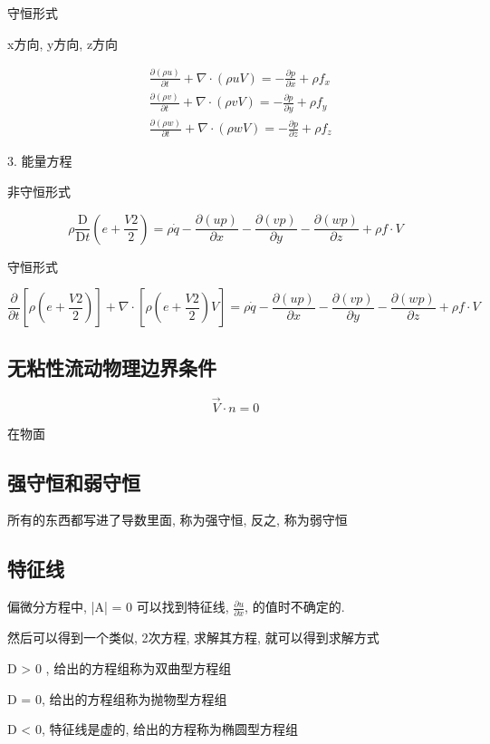 \documentclass[UTF8]{ctexart}
\begin{document}
守恒形式

x方向, y方向, z方向

$$
	\begin{aligned}
		 & \frac{\partial(\rho u)}{\partial t}+\nabla \cdot(\rho u V)=-\frac{\partial p}{\partial x}+\rho f_{x} \\
		 & \frac{\partial(\rho v)}{\partial t}+\nabla \cdot(\rho v V)=-\frac{\partial p}{\partial y}+\rho f_{y} \\
		 & \frac{\partial(\rho w)}{\partial t}+\nabla \cdot(\rho w V)=-\frac{\partial p}{\partial z}+\rho f_{z}
	\end{aligned}
$$

3. 能量方程

非守恒形式

$$
	\rho \frac{\mathrm{D}}{\mathrm{D} t}\left(e+\frac{V 2}{2}\right)=\rho \dot{q}-\frac{\partial(u p)}{\partial x}-\frac{\partial(v p)}{\partial y}-\frac{\partial(w p)}{\partial z}+\rho f \cdot V
$$

守恒形式

$$
	\frac{\partial}{\partial t}\left[\rho\left(e+\frac{V 2}{2}\right)\right]+\nabla \cdot\left[\rho\left(e+\frac{V 2}{2}\right) V\right]=\rho \dot{q}-\frac{\partial(u p)}{\partial x}-\frac{\partial(v p)}{\partial y}-\frac{\partial(w p)}{\partial z}+\rho f \cdot V
$$

\subsection{无粘性流动物理边界条件}
$$
	\vec{V} \cdot n = 0
$$

在物面

\subsection{强守恒和弱守恒}

所有的东西都写进了导数里面, 称为强守恒, 反之, 称为弱守恒

\subsection{特征线}
偏微分方程中, |A| = 0 可以找到特征线, $\frac{\partial u}{\partial x}$, 的值时不确定的.

然后可以得到一个类似, 2次方程, 求解其方程, 就可以得到求解方式

D > 0 , 给出的方程组称为双曲型方程组

D = 0, 给出的方程组称为抛物型方程组

D < 0, 特征线是虚的, 给出的方程称为椭圆型方程组
\end{document}
